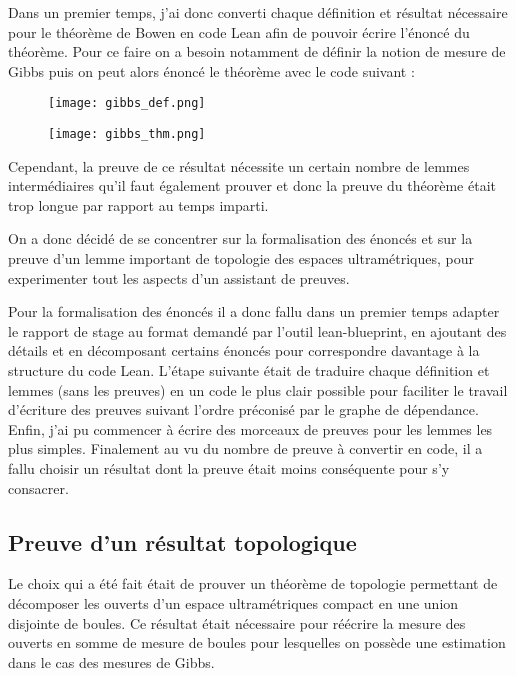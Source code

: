 \documentclass[../../rapport.tex]{subfiles}
\begin{document}
  Dans un premier temps, j'ai donc converti chaque définition et résultat nécessaire pour le théorème de Bowen en code Lean
  afin de pouvoir écrire l'énoncé du théorème.
  Pour ce faire on a besoin notamment de définir la notion de mesure de Gibbs puis on peut alors énoncé le théorème
  avec le code suivant :
  \begin{figure}[ht]
    \centering
    \texttt{[image: gibbs\_def.png]}

    \vspace{0.5cm}
    \texttt{[image: gibbs\_thm.png]}
  \end{figure}

  Cependant, la preuve de ce résultat nécessite un certain nombre de lemmes intermédiaires qu'il faut également prouver
  et donc la preuve du théorème était trop longue par rapport au temps imparti.

  On a donc décidé de se concentrer sur la formalisation des énoncés et sur la preuve d'un lemme important
  de topologie des espaces ultramétriques, pour experimenter tout les aspects d'un assistant de preuves.

  Pour la formalisation des énoncés il a donc fallu dans un premier temps adapter le rapport de stage au format demandé
  par l'outil lean-blueprint, en ajoutant des détails et en décomposant certains énoncés pour correspondre davantage à la structure
  du code Lean. L'étape suivante était de traduire chaque définition et lemmes (sans les preuves) en un code le plus clair possible
  pour faciliter le travail d'écriture des preuves suivant l'ordre préconisé par le graphe de dépendance.
  Enfin, j'ai pu commencer à écrire des morceaux de preuves pour les lemmes les plus simples.
  Finalement au vu du nombre de preuve à convertir en code, il a fallu choisir un résultat dont la
  preuve était moins conséquente pour s'y consacrer.

  \subsection{Preuve d'un résultat topologique}

  Le choix qui a été fait était de prouver un théorème de topologie permettant de décomposer les ouverts d'un espace ultramétriques compact
  en une union disjointe de boules.
  Ce résultat était nécessaire pour réécrire la mesure des ouverts en somme de mesure de boules pour lesquelles on possède une estimation
  dans le cas des mesures de Gibbs.
\end{document}

